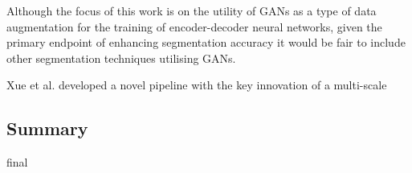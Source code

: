Although the focus of this work is on the utility of GANs as a type of data
augmentation for the training of encoder-decoder neural networks, given the
primary endpoint of enhancing segmentation accuracy it would be fair to include
other segmentation techniques utilising GANs. \newline

Xue et al. \cite{zhangSegGANSemanticSegmentation2018} developed a novel pipeline
with the key innovation of a multi-scale 

\subsection{Summary}

final